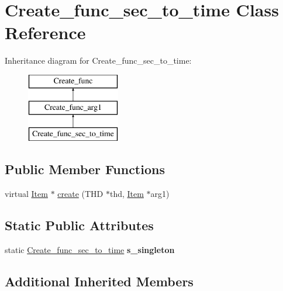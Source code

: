 \hypertarget{classCreate__func__sec__to__time}{}\section{Create\+\_\+func\+\_\+sec\+\_\+to\+\_\+time Class Reference}
\label{classCreate__func__sec__to__time}
Inheritance diagram for Create\+\_\+func\+\_\+sec\+\_\+to\+\_\+time\+:\begin{figure}[H]
\begin{center}
\leavevmode
\includegraphics[height=3.000000cm]{classCreate__func__sec__to__time}
\end{center}
\end{figure}
\subsection*{Public Member Functions}
\begin{DoxyCompactItemize}
\item 
virtual \mbox{\hyperlink{classItem}{Item}} $\ast$ \mbox{\hyperlink{classCreate__func__sec__to__time_a2d9bcc4b212b27bbd1c063d14a86ef4c}{create}} (T\+HD $\ast$thd, \mbox{\hyperlink{classItem}{Item}} $\ast$arg1)
\end{DoxyCompactItemize}
\subsection*{Static Public Attributes}
\begin{DoxyCompactItemize}
\item 
\mbox{\label{classCreate__func__sec__to__time_a3f4ef69e65cc16bb8a5f6c8e77fa7f6a}} 
static \mbox{\hyperlink{classCreate__func__sec__to__time}{Create\+\_\+func\+\_\+sec\+\_\+to\+\_\+time}} {\bfseries s\+\_\+singleton}
\end{DoxyCompactItemize}
\subsection*{Additional Inherited Members}


